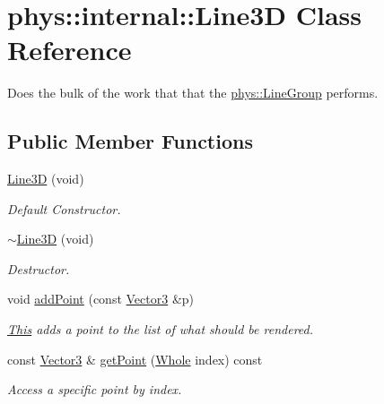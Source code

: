 \hypertarget{classphys_1_1internal_1_1Line3D}{
\section{phys::internal::Line3D Class Reference}
\label{d4/db5/classphys_1_1internal_1_1Line3D}
}


Does the bulk of the work that that the \hyperlink{classphys_1_1LineGroup}{phys::LineGroup} performs.  


\subsection*{Public Member Functions}
\begin{DoxyCompactItemize}
\item 
\hyperlink{classphys_1_1internal_1_1Line3D_ab22b8f5fae0bb2585b1031adfff424bd}{Line3D} (void)
\begin{DoxyCompactList}\small\item\em Default Constructor. \item\end{DoxyCompactList}\item 
\hyperlink{classphys_1_1internal_1_1Line3D_acddc95dd5f319d6afc68260af8bea39c}{$\sim$Line3D} (void)
\begin{DoxyCompactList}\small\item\em Destructor. \item\end{DoxyCompactList}\item 
void \hyperlink{classphys_1_1internal_1_1Line3D_aeb3b828b35b4c8ed76158285be6ddc67}{addPoint} (const \hyperlink{classphys_1_1Vector3}{Vector3} \&p)
\begin{DoxyCompactList}\small\item\em \hyperlink{structThis}{This} adds a point to the list of what should be rendered. \item\end{DoxyCompactList}\item 
const \hyperlink{classphys_1_1Vector3}{Vector3} \& \hyperlink{classphys_1_1internal_1_1Line3D_a190af0e38be28297ed2f6a7aecf0c316}{getPoint} (\hyperlink{namespacephys_a460f6bc24c8dd347b05e0366ae34f34a}{Whole} index) const 
\begin{DoxyCompactList}\small\item\em Access a specific point by index. \item\end{DoxyCompactList}\item 

\end{DoxyCompactItemize}
